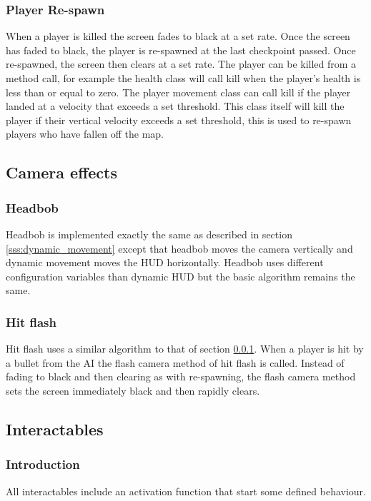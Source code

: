 \documentclass[11pt,a4paper]{article}
\begin{document}
\subsubsection{Player Re-spawn}
\label{sss:re-spawn}
When a player is killed the screen fades to black  at a set rate. Once the screen has faded to black, the player is re-spawned at the last checkpoint passed. Once re-spawned, the screen then clears at a set rate. The player can be killed from a method call, for example the health class will call kill when the player's health is less than or equal to zero. The player movement class can call kill if the player landed at a velocity that exceeds a set threshold. This class itself will kill the player if their vertical velocity exceeds a set threshold, this is used to re-spawn players who have fallen off the map.
\subsection{Camera effects}
\subsubsection{Headbob}
Headbob is implemented exactly the same as described in section \ref{sss:dynamic_movement} except that headbob moves the camera vertically and dynamic movement moves the HUD horizontally. Headbob uses different configuration variables than dynamic HUD but the basic algorithm remains the same.
\subsubsection{Hit flash}
Hit flash uses a similar algorithm to that of section \ref{sss:re-spawn}. When a player is hit by a bullet from the AI the flash camera method of hit flash is called. Instead of fading to black and then clearing as with re-spawning, the flash camera method sets the screen immediately black and then rapidly clears.
\subsection{Interactables}
\subsubsection{Introduction}
All interactables include an activation function that start some defined behaviour.
\end{document}
